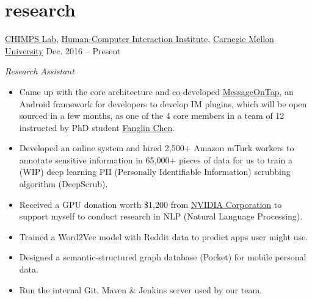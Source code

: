 \documentclass[hidelinks__VERSION__]{adamyi-cv}
\begin{document}

\section{research}

\begin{entrylist}


\entry
{\href{http://cmuchimps.org/}{CHIMPS Lab}, \href{https://www.hcii.cmu.edu/}{Human-Computer Interaction Institute}, \href{https://www.cmu.edu/}{Carnegie Mellon University}}
{Dec. 2016 -- Present}
{\emph{Research Assistant}
\begin{itemize}
\item Came up with the core architecture and co-developed \href{https://github.com/MessageOnTap}{MessageOnTap}, an Android framework for developers to develop IM plugins, which will be open sourced in a few months, as one of the 4 core members in a team of 12 instructed by PhD student \href{mailto:fanglin@cmu.edu}{Fanglin Chen}.
\item Developed an online system and hired 2,500+ Amazon mTurk workers to annotate sensitive information in 65,000+ pieces of data for us to train a (WIP) deep learning PII (Personally Identifiable Information) scrubbing algorithm (DeepScrub).
\item Received a GPU donation worth \$1,200 from \href{https://www.nvidia.com/}{NVIDIA Corporation} to support myself to conduct research in NLP (Natural Language Processing).
\item Trained a Word2Vec model with Reddit data to predict apps user might use.
\item Designed a semantic-structured graph database (Pocket) for mobile personal data.
\item Run the internal Git, Maven \& Jenkins server used by our team.
\end{itemize}}



\end{entrylist}
\end{document}
